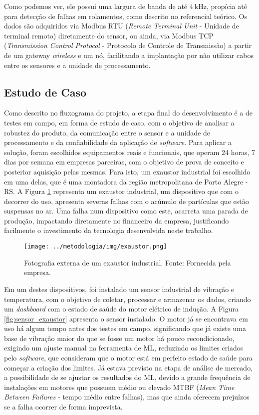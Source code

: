 \documentclass[a4paper]{ifacconf}
\begin{document}
Como podemos ver, ele possui uma largura de banda de até $\SI{4}{\kilo\hertz}$, propícia até para detecção de falhas em rolamentos, como 
descrito no referencial teórico. Os dados são adquiridos via Modbus RTU (\textit{Remote Terminal Unit} - Unidade de terminal remoto) diretamente
do sensor, ou ainda, via Modbus TCP (\textit{Transmission Control Protocol} - Protocolo de Controle de Transmissão) a partir de um gateway
\textit{wireless} e um nó, facilitando a implantação por não utilizar cabos entre os sensores e a unidade de processamento.


\subsection{Estudo de Caso}

Como descrito no fluxograma do projeto, a etapa final do desenvolvimento é a de testes em campo, em forma de estudo de caso, com o objetivo 
de analisar a robustez do produto, da comunicação entre o sensor e a unidade de processamento e da confiabilidade da aplicação de \textit{software}. 
Para aplicar a solução, foram escolhidos equipamentos reais e funcionais, que operam 24 horas, 7 dias por semana em empresas parceiras,
com o objetivo de prova de conceito e posterior aquisição pelas mesmas. Para isto, um exaustor industrial foi escolhido em uma delas, que é 
uma montadora da região metropolitana de Porto Alegre - RS. A Figura \ref{fig:exautor} representa um exaustor industrial, um dispositivo que com
o decorrer do uso, apresenta severas falhas com o acúmulo de partículas que estão suspensas no ar. 
Uma falha num dispositivo como este, acarreta uma parada de  produção, impactando diretamente no financeiro da empresa, justificando 
facilmente o investimento da tecnologia desenvolvida neste trabalho.

\begin{figure}[h!]
  \begin{center}
      \texttt{[image: ../metodologia/img/exaustor.png]}
  \end{center}
  \caption{Fotografia externa de um exaustor industrial. Fonte: Fornecida pela empresa.}
  \label{fig:exautor}
\end{figure}

Em um destes dispositivos, foi instalado um sensor industrial de vibração e temperatura, com o objetivo de coletar, processar e armazenar os
dados, criando um \textit{dashboard} com o estado de saúde do motor elétrico de indução. A Figura \ref{fig:sensor_exaustor} apresenta o sensor instalado.
O motor já se encontrava em uso há algum tempo antes dos testes em campo, significando que já existe uma base de vibração maior do que se fosse
um motor há pouco recondicionado, exigindo um ajuste manual na ferramenta de ML, reduzindo os limites criados pelo \textit{software}, que
consideram que o motor está em perfeito estado de saúde para começar a criação dos limites. Já estava previsto na etapa de análise de mercado, 
a possibilidade de se ajustar os resultados do ML, devido a grande frequência de instalações em motores que possuem médio ou
elevado MTBF (\textit{Mean Time Between Failures} - tempo médio entre falhas), mas que ainda oferecem prejuízos se a falha ocorrer de forma 
imprevista.
\end{document}
